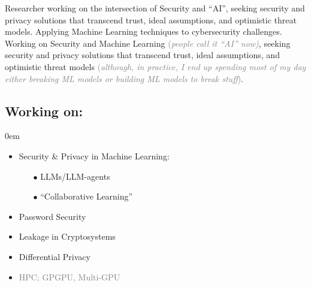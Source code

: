 \documentclass[margin, 10pt]{article} %
\begin{document}
\vspace{.2cm}
 \ifita
 \noindent Researcher working on the intersection of Security and ``AI'', seeking security and privacy solutions that transcend trust, ideal assumptions, and optimistic threat models. Applying Machine Learning techniques to cybersecurity challenges.
 \else
  \noindent Working on Security and Machine Learning \textcolor{gray}{(\textit{people call it ``AI'' now)}}, seeking security and privacy solutions that transcend trust, ideal assumptions, and optimistic threat models \textcolor{gray}{(\textit{although, in practice, I end up spending most of my day either breaking ML models or building ML models to break stuff})}.
 \fi
 

\subsection*{Working on:} 
\itemsep0em 
\begin{itemize}
\itemsep0em 
\item Security \& Privacy in Machine Learning:
	\begin{itemize}
	\item[$\bullet$] LLMs/LLM-agents \cite{nes, llmmap, hackai}
		\item[$\bullet$]  ``Collaborative Learning'' \cite{dl, CCS21, CCS22}  		
	\end{itemize}
\item Password Security \cite{uncm, SP21, adam}
\item Leakage in Cryptosystems \cite{MIGP, CCS22} 
\item Differential Privacy \cite{uncm}
\item \textcolor{gray}{
 HPC; GPGPU, Multi-GPU \cite{MONOAMG}}
\end{itemize}
\end{document}
